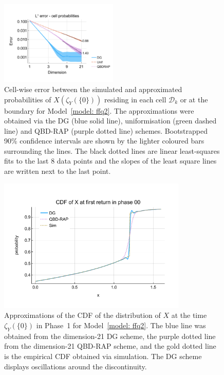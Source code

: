 \begin{figure}[h]
	\centering
	\includegraphics[width=0.5\textwidth,trim={0.75cm 0.8cm 0.25cm 1.25cm},clip]{chapter6/figs/ffq/discts/l1_cell_probs_error_formatted.pdf}%
	\caption{Cell-wise error between the simulated and approximated probabilities of \(X(\zeta_{Y}(\{0\}))\) residing in each cell \(\mathcal D_k\) or at the boundary for Model~\ref{model: ffq2}. The approximations were obtained via the DG (blue solid line), uniformisation (green dashed line) and QBD-RAP (purple dotted line) schemes. Bootstrapped 90\% confidence intervals are shown by the lighter coloured bars surrounding the lines. The black dotted lines are linear least-squares fits to the last 8 data points and the slopes of the least square lines are written next to the last point.} 
	\label{fig: ffq2 cell probs} 
\end{figure}
\begin{figure}[h] 
	\centering
	\includegraphics[width=0.8\textwidth,trim={0cm 1.25cm 0cm 1.25cm},clip]{chapter6/figs/ffq/discts/phase_4_cdf.pdf}%
	\caption{Approximations of the CDF of the distribution of \(X\) at the time \(\zeta_Y(\{0\})\) in Phase~1 for Model~\ref{model: ffq2}. The blue line was obtained from the dimension-21 DG scheme, the purple dotted line from the dimension-21 QBD-RAP scheme, and the gold dotted line is the empirical CDF obtained via simulation. The DG scheme displays oscillations around the discontinuity. } 
	\label{fig: ffq2 oscillation} 
\end{figure}
\FloatBarrier


